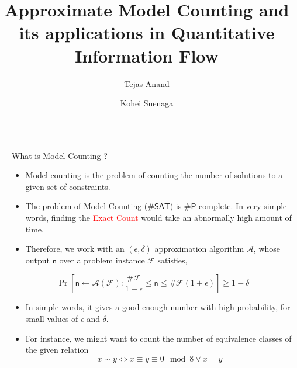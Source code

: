 \documentclass[final]{beamer}
\title{Approximate Model Counting and its applications in Quantitative Information Flow}
\author{Tejas Anand\inst{1} \and Kohei Suenaga\inst{2}}
\institute[shortinst]{IIT Delhi \inst{1} \samelineand Kyoto University \inst{2} }
\newlength{\sepwidth}
\newlength{\colwidth}
\newcommand{\separatorcolumn}{\begin{column}{\sepwidth}\end{column}}
\begin{document}
\begin{frame}[t]
\begin{columns}[t]
\separatorcolumn

\begin{column}{\colwidth}

  \begin{block}{What is Model Counting ? }



    	\begin{itemize}
		\item Model counting is the problem of counting the number of solutions to a given set of constraints.
		\item The problem of Model Counting (\#$\mathsf{SAT}$) is \#$\mathsf{P}$-complete. In very simple words, finding the \textcolor{red}{Exact Count} would take an abnormally high amount of time.
		\item Therefore, we work with an $(\epsilon,\delta)$ approximation algorithm $\mathcal{A}$, whose output $\mathsf{n}$ over a problem instance $\mathcal{F}$ satisfies,

	\end{itemize}
	\[
		\Pr[\mathsf{n} \leftarrow \mathcal{A}(\mathcal{F}) :  \frac{\#\mathcal{F}}{1 + \epsilon} \leq \mathsf{n} \leq \#\mathcal{F}(1 + \epsilon)  ]	 \geq  1 - \delta
	\]
	\begin{itemize}
		\item  In simple words, it gives a good enough number with high probability, for small values of $\epsilon$ and $\delta$.
		\item For instance, we might want to count the number of equivalence classes of the given relation
		\begin{equation}
			x \sim y \Leftrightarrow x \equiv y \equiv 0 \mod 8 \vee x = y
		\end{equation}
	\end{itemize}
  \end{block}


\end{column}
\end{columns}
\end{frame}
\end{document}
